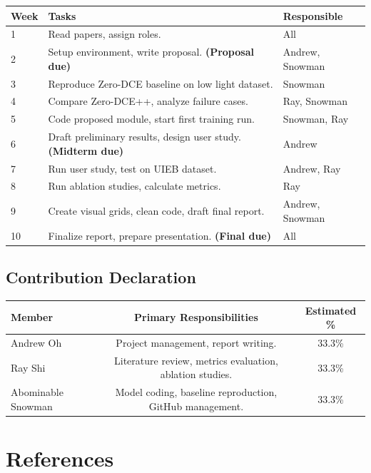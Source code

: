 \documentclass[11pt, letterpaper]{article}
\begin{document}
\begin{center}
\begin{tabular}{lp{7cm}l}
\toprule
\textbf{Week} & \textbf{Tasks} & \textbf{Responsible} \\
\midrule
1 & Read papers, assign roles. & All \\
2 & Setup environment, write proposal. \textbf{(Proposal due)} & Andrew, Snowman \\
3 & Reproduce Zero-DCE baseline on low light dataset. & Snowman \\
4 & Compare Zero-DCE++, analyze failure cases. & Ray, Snowman \\
5 & Code proposed module, start first training run. & Snowman, Ray \\
6 & Draft preliminary results, design user study. \textbf{(Midterm due)} & Andrew \\
7 & Run user study, test on UIEB dataset. & Andrew, Ray \\
8 & Run ablation studies, calculate metrics. & Ray \\
9 & Create visual grids, clean code, draft final report. & Andrew, Snowman \\
10 & Finalize report, prepare presentation. \textbf{(Final due)} & All \\
\bottomrule
\end{tabular}
\end{center}

\subsection{Contribution Declaration}

\begin{tabular}{lcc}
\toprule
\textbf{Member} & \textbf{Primary Responsibilities} & \textbf{Estimated \%} \\
\midrule
{Andrew Oh} & Project management, report writing. & 33.3\%  \\
{Ray Shi}& Literature review, metrics evaluation, ablation studies. & 33.3\%  \\
{Abominable Snowman} & Model coding, baseline reproduction, GitHub management. & 33.3\%  \\
\bottomrule
\end{tabular}

\section{References}
\end{document}
